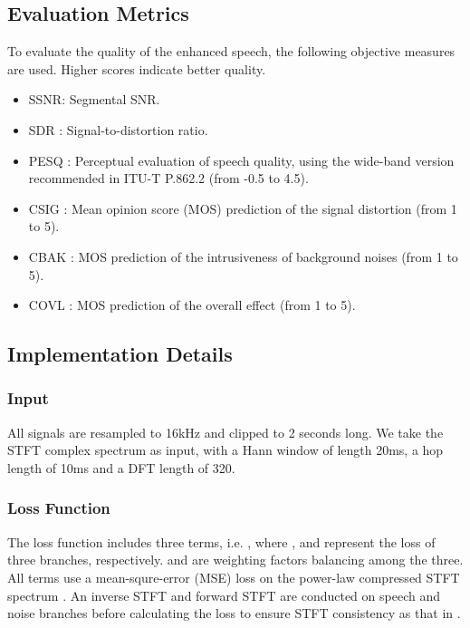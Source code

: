 \documentclass[letterpaper]{article} \usepackage{snnet}  \usepackage{times}  \usepackage{helvet} \usepackage{courier}  \usepackage[hyphens]{url}  \usepackage{graphicx} \urlstyle{rm} \def\UrlFont{\rm}  \usepackage{graphicx}  \usepackage{natbib}  \usepackage{caption} \usepackage{amsfonts}  \usepackage{amsmath}  \usepackage{multirow} \usepackage{tablefootnote}  \usepackage[switch]{lineno}
\begin{document}
\subsection{Evaluation Metrics}

\noindent To evaluate the quality of the enhanced speech, the following objective measures are used. Higher scores indicate better quality.

\begin{itemize}
    \item SSNR: Segmental SNR.
    \item SDR \cite{vincent2006performance}: Signal-to-distortion ratio.
    \item PESQ \cite{rec2005p}: Perceptual evaluation of speech quality, using the wide-band version recommended in ITU-T P.862.2 (from -0.5 to 4.5).
    \item CSIG \cite{hu2007evaluation}: Mean opinion score (MOS) prediction of the signal distortion (from 1 to 5).
    \item CBAK \cite{hu2007evaluation}: MOS prediction of the intrusiveness of background noises (from 1 to 5).
    \item COVL \cite{hu2007evaluation}: MOS prediction of the overall effect (from 1 to 5).
\end{itemize}

\subsection{Implementation Details}
\subsubsection{Input}
All signals are resampled to 16kHz and clipped to 2 seconds long. We take the STFT complex spectrum as input, with a Hann window of length 20ms, a hop length of 10ms and a DFT length of 320. 

\subsubsection{Loss Function}
The loss function includes three terms, i.e. , where ,  and  represent the loss of three branches, respectively.  and  are weighting factors balancing among the three. All terms use a mean-squre-error (MSE) loss on the power-law compressed STFT spectrum \cite{ephrat2018looking}. An inverse STFT and forward STFT are conducted on speech and noise branches before calculating the loss to ensure STFT consistency as that in \cite{wisdom2019differentiable}.
\end{document}
